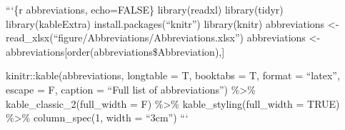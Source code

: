 \documentclass[11pt,twoside]{bristolthesis}
\begin{document}
  \begin{abbreviations}
    ```\{r abbreviations, echo=FALSE\}
    library(readxl)
    library(tidyr)
    library(kableExtra)
    install.packages(``knitr'')
    library(knitr)
    abbreviations \textless- read\_xlsx(``figure/Abbreviations/Abbreviations.xlsx'')
    abbreviations \textless- abbreviations{[}order(abbreviations\$Abbreviation),{]}

    kinitr::kable(abbreviations, longtable = T, booktabs = T, format = ``latex'', escape = F,
    caption = ``Full list of abbreviations'') \%\textgreater\%
    kable\_classic\_2(full\_width = F) \%\textgreater\%
    kable\_styling(full\_width = TRUE) \%\textgreater\%
    column\_spec(1, width = ``3cm'')
    ```
  \end{abbreviations}
\end{document}
